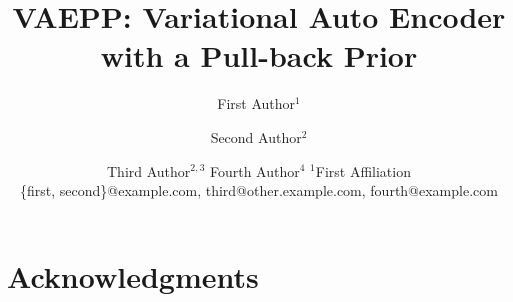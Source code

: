 \documentclass{article}
\title{VAEPP: Variational Auto Encoder with a Pull-back Prior}
\author{
First Author$^1$
\and
Second Author$^2$\and
Third Author$^{2,3}$\And
Fourth Author$^4$
\affiliations
$^1$First Affiliation\\
\emails
\{first, second\}@example.com,
third@other.example.com,
fourth@example.com
}
\begin{document}
\maketitle










\section*{Acknowledgments}

\appendix



\end{document}
